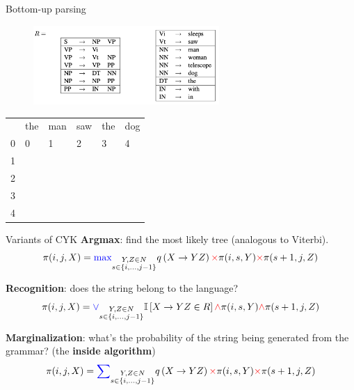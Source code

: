 \documentclass[usenames,dvipsnames,notes,11pt,aspectratio=169]{beamer}
\begin{document}
\begin{frame}
    {Bottom-up parsing}
    \begin{figure}
        \includegraphics[height=3cm]{figures/toy-cfg-2.png}
    \end{figure}
    \vspace{-2em}
    \begin{table}
        \begin{tabular}{c|p{1.2cm}|p{1.2cm}|p{1.2cm}|p{1.2cm}|p{1.2cm}}
        \hline
        & the & man & saw & the & dog \\
        0 & 0 & 1 & 2 & 3 & 4 \\
        \hline
        1 &&&&&\\[2ex]
        \hline
        2 &&&&&\\[2ex]
        \hline
        3 &&&&&\\[2ex]
        \hline
        4 &&&&&\\[2ex]
        \hline
    \end{tabular}
    \end{table}
\end{frame}

\begin{frame}
    {Variants of CYK}
    \textbf{Argmax}: find the most likely tree (analogous to Viterbi).
    $$
    \pi(i,j,X) = {\color{blue}\max}_{\substack{Y,Z\in N\\ s\in\left\{ i,\ldots,j-1 \right\}}}
    q\left( X\rightarrow YZ \right) {\color{red}\times} \pi(i,s,Y) {\color{red}\times} \pi(s+1, j, Z)
    $$

    \textbf{Recognition}: does the string belong to the language?
    $$
    \pi(i,j,X) = {\color{blue}\vee}_{\substack{Y,Z\in N\\ s\in\left\{ i,\ldots,j-1 \right\}}}
    \mathbb{I}\left[ X\rightarrow YZ\in R \right] {\color{red}\wedge} \pi(i,s,Y) {\color{red}\wedge} \pi(s+1, j, Z)
    $$

    \textbf{Marginalization}: what's the probability of the string being generated from the grammar? (the \textbf{inside algorithm})
    $$
    \pi(i,j,X) = {\color{blue}\sum}_{\substack{Y,Z\in N\\ s\in\left\{ i,\ldots,j-1 \right\}}}
    q\left( X\rightarrow YZ \right) {\color{red}\times} \pi(i,s,Y) {\color{red}\times} \pi(s+1, j, Z)
    $$

\end{frame}
\end{document}
